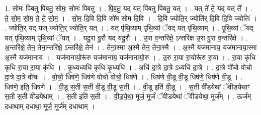 \documentclass[17pt]{extarticle}
\begin{document}
1. सोमः॑ पिबतु पिबतु॒ सोमः॒ सोमः॑ पिबतु । . पि॒ब॒तु॒ यद् यत् पि॑बतु पिबतु॒ यत् । . यत् ते॑ ते॒ यद् यत् ते᳚ । . ते॒ सो॒म॒ सो॒म॒ ते॒ ते॒ सो॒म॒ । . सो॒म॒ दि॒वि दि॒वि सो॑म सोम दि॒वि । . दि॒वि ज्योति॒र् ज्योति॑र् दि॒वि दि॒वि ज्योतिः॑ । . ज्योति॒र् यद् यज् ज्योति॒र् ज्योति॒र् यत् । . यत् पृ॑थि॒व्याम् पृ॑थि॒व्यां ॅयद् यत् पृ॑थि॒व्याम् । . पृ॒थि॒व्यां ॅयद् यत् पृ॑थि॒व्याम् पृ॑थि॒व्यां ॅयत् । . यदु॒रा वु॒रौ यद् यदु॒रौ । . उ॒रा व॒न्तरि॑क्षे॒ ऽन्तरि॑क्ष उ॒रा वु॒रा व॒न्तरि॑क्षे । . अ॒न्तरि॑क्षे॒ तेन॒ तेना॒न्तरि॑क्षे॒ ऽन्तरि॑क्षे॒ तेन॑ । . तेना॒स्मा अ॒स्मै तेन॒ तेना॒स्मै । . अ॒स्मै यज॑मानाय॒ यज॑मानाया॒स्मा अ॒स्मै यज॑मानाय । . यज॑मानायो॒रू॑रु यज॑मानाय॒ यज॑मानायो॒रु । . उ॒रु रा॒या रा॒योरू॑रु रा॒या । . रा॒या कृ॑धि कृधि रा॒या रा॒या कृ॑धि । . कृ॒ध्यध्यधि॑ कृधि कृ॒ध्यधि॑ । . अधि॑ दा॒त्रे दा॒त्रे ऽध्यधि॑ दा॒त्रे । . दा॒त्रे वो॑चो वोचो दा॒त्रे दा॒त्रे वो॑चः । . वो॒चो॒ धिष॑णे॒ धिष॑णे वोचो वोचो॒ धिष॑णे । . धिष॑णे वी॒डू वी॒डू धिष॑णे॒ धिष॑णे वी॒डू । . धिष॑णे॒ इति॒ धिष॑णे । . वी॒डू स॒ती स॒ती वी॒डू वी॒डू स॒ती । . वी॒डू इति॑ वी॒डू । . स॒ती वी॑डयेथां ॅवीडयेथाꣳ स॒ती स॒ती वी॑डयेथाम् । . स॒ती इति॑ स॒ती । . वी॒ड॒ये॒था॒ मूर्ज॒ मूर्जं॑ ॅवीडयेथां ॅवीडयेथा॒ मूर्ज᳚म् । . ऊर्ज॑म् दधाथाम् दधाथा॒ मूर्ज॒ मूर्ज॑म् दधाथाम् । \newline
\end{document}
